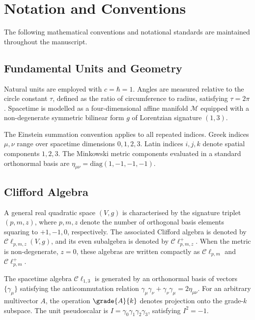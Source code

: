 \chapter*{Notation and Conventions}

The following mathematical conventions and notational standards are maintained
throughout the manuscript.

\section*{Fundamental Units and Geometry}
Natural units are employed with $c = \hbar = 1$.
Angles are measured relative to the circle constant $\tau$, defined as the ratio
of circumference to radius, satisfying $\tau = 2\pi$.
Spacetime is modelled as a four-dimensional affine manifold $\mathcal{M}$
equipped with a non-degenerate symmetric bilinear form $g$ of Lorentzian
signature $(1, 3)$.

The Einstein summation convention applies to all repeated indices.
Greek indices $\mu, \nu$ range over spacetime dimensions $0, 1, 2, 3$.
Latin indices $i, j, k$ denote spatial components $1, 2, 3$.
The Minkowski metric components evaluated in a standard orthonormal basis are
$\eta_{\mu\nu} = \mathrm{diag}(1, -1, -1, -1)$.

\section*{Clifford Algebra}

A general real quadratic space $(V, g)$ is characterised by the signature
triplet $(p, m, z)$, where $p, m, z$ denote the number of orthogonal basis
elements squaring to $+1, -1, 0$, respectively.
The associated Clifford algebra is denoted by $\mathcal{C}\ell_{p,m,z}(V, g)$,
and its even subalgebra is denoted by $\mathcal{C}\ell^+_{p,m,z}$.
When the metric is non-degenerate, $z = 0$, these algebras are written
compactly as $\mathcal{C}\ell_{p,m}$ and $\mathcal{C}\ell^+_{p,m}$.

The spacetime algebra $\mathcal{C}\ell_{1,3}$ is generated by an orthonormal
basis of vectors $\{\gamma_\mu\}$ satisfying the anticommutation relation
$\gamma_\mu \gamma_\nu + \gamma_\nu \gamma_\mu = 2\eta_{\mu\nu}$.
For an arbitrary multivector $A$, the operation $\grade{A}{k}$ denotes
projection onto the grade-$k$ subspace.
The unit pseudoscalar is $I = \gamma_0 \gamma_1 \gamma_2 \gamma_3$, satisfying
$I^2 = -1$.

